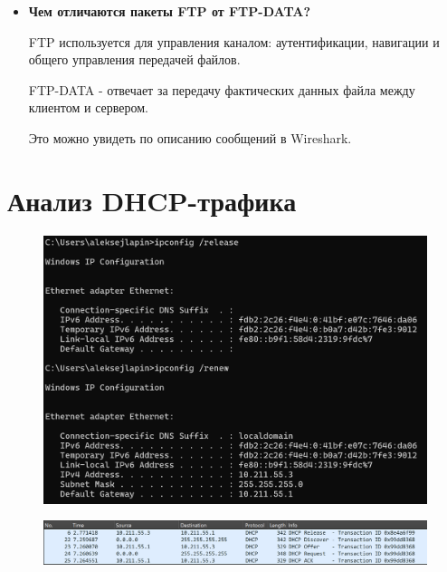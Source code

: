 \documentclass[12pt,onecolumn]{article}
\begin{document}
\begin{itemize}
{        Для FTP-DATA может быть выбран любой порт, либо по умолчанию используется 20.
    }
    \item {
        \textbf{Чем отличаются пакеты FTP от FTP-DATA?}

        FTP используется для управления каналом: аутентификации, навигации и
        общего управления передачей файлов.

        FTP-DATA - отвечает за передачу фактических данных файла между клиентом и
        сервером.

        Это можно увидеть по описанию сообщений в Wireshark.
    }
\end{itemize}
\section{Анализ DHCP-трафика}
\begin{figure}[H]
    \centering
    \includegraphics*[width=\textwidth]{image/part8/ip.png}
\end{figure}
\begin{figure}[H]
    \centering
    \includegraphics*[width=\textwidth]{image/part8/dhcp.png}
\end{figure}
\end{document}
